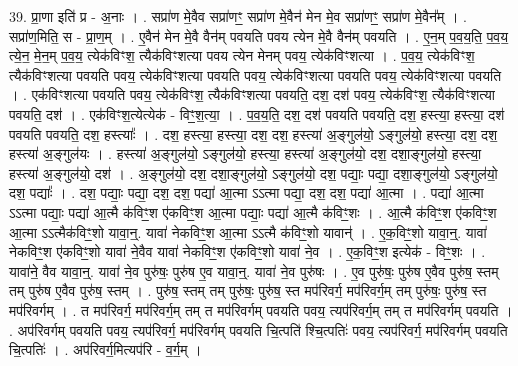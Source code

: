 \documentclass[17pt]{extarticle}
\begin{document}
39. प्रा॒णा इति॑ प्र - अ॒नाः । . सप्रा॑ण मे॒वैव सप्रा॑णꣳ॒॒ सप्रा॑ण मे॒वैन॑ मेन मे॒व सप्रा॑णꣳ॒॒ सप्रा॑ण मे॒वैन᳚म् । . सप्रा॑ण॒मिति॒ स - प्रा॒ण॒म् । . ए॒वैन॑ मेन मे॒वै वैन॑म् पवयति पवय त्येन मे॒वै वैन॑म् पवयति । . ए॒न॒म् प॒व॒य॒ति॒ प॒व॒य॒ त्ये॒न॒ मे॒न॒म् प॒व॒य॒ त्येक॑विꣳश॒ त्यैक॑विꣳशत्या पवय त्येन मेनम् पवय॒ त्येक॑विꣳशत्या । . प॒व॒य॒ त्येक॑विꣳश॒ त्यैक॑विꣳशत्या पवयति पवय॒ त्येक॑विꣳशत्या पवयति पवय॒ त्येक॑विꣳशत्या पवयति पवय॒ त्येक॑विꣳशत्या पवयति । . एक॑विꣳशत्या पवयति पवय॒ त्येक॑विꣳश॒ त्यैक॑विꣳशत्या पवयति॒ दश॒ दश॑ पवय॒ त्येक॑विꣳश॒ त्यैक॑विꣳशत्या पवयति॒ दश॑ । . एक॑विꣳश॒त्येत्येक॑ - विꣳ॒॒श॒त्या॒ । . प॒व॒य॒ति॒ दश॒ दश॑ पवयति पवयति॒ दश॒ हस्त्या॒ हस्त्या॒ दश॑ पवयति पवयति॒ दश॒ हस्त्याः᳚ । . दश॒ हस्त्या॒ हस्त्या॒ दश॒ दश॒ हस्त्या॑ अ॒ङ्गुल॑यो॒ ऽङ्गुल॑यो॒ हस्त्या॒ दश॒ दश॒ हस्त्या॑ अ॒ङ्गुल॑यः । . हस्त्या॑ अ॒ङ्गुल॑यो॒ ऽङ्गुल॑यो॒ हस्त्या॒ हस्त्या॑ अ॒ङ्गुल॑यो॒ दश॒ दशा॒ङ्गुल॑यो॒ हस्त्या॒ हस्त्या॑ अ॒ङ्गुल॑यो॒ दश॑ । . अ॒ङ्गुल॑यो॒ दश॒ दशा॒ङ्गुल॑यो॒ ऽङ्गुल॑यो॒ दश॒ पद्याः॒ पद्या॒ दशा॒ङ्गुल॑यो॒ ऽङ्गुल॑यो॒ दश॒ पद्याः᳚ । . दश॒ पद्याः॒ पद्या॒ दश॒ दश॒ पद्या॑ आ॒त्मा ऽऽत्मा पद्या॒ दश॒ दश॒ पद्या॑ आ॒त्मा । . पद्या॑ आ॒त्मा ऽऽत्मा पद्याः॒ पद्या॑ आ॒त्मै क॑विꣳ॒॒श ए॑कविꣳ॒॒श आ॒त्मा पद्याः॒ पद्या॑ आ॒त्मै क॑विꣳ॒॒शः । . आ॒त्मै क॑विꣳ॒॒श ए॑कविꣳ॒॒श आ॒त्मा ऽऽत्मैक॑विꣳ॒॒शो यावा॒न्॒. यावा॑ नेकविꣳ॒॒श आ॒त्मा ऽऽत्मै क॑विꣳ॒॒शो यावान्॑ । . ए॒क॒विꣳ॒॒शो यावा॒न्॒. यावा॑ नेकविꣳ॒॒श ए॑कविꣳ॒॒शो यावा॑ ने॒वैव यावा॑ नेकविꣳ॒॒श ए॑कविꣳ॒॒शो यावा॑ ने॒व । . ए॒क॒विꣳ॒॒श इत्येक॑ - विꣳ॒॒शः । . यावा॑ने॒ वैव यावा॒न्॒. यावा॑ ने॒व पुरु॑षः॒ पुरु॑ष ए॒व यावा॒न्॒. यावा॑ ने॒व पुरु॑षः । . ए॒व पुरु॑षः॒ पुरु॑ष ए॒वैव पुरु॑ष॒ स्तम् तम् पुरु॑ष ए॒वैव पुरु॑ष॒ स्तम् । . पुरु॑ष॒ स्तम् तम् पुरु॑षः॒ पुरु॑ष॒ स्त मप॑रिवर्ग॒ मप॑रिवर्ग॒म् तम् पुरु॑षः॒ पुरु॑ष॒ स्त मप॑रिवर्गम् । . त मप॑रिवर्ग॒ मप॑रिवर्ग॒म् तम् त मप॑रिवर्गम् पवयति पवय॒ त्यप॑रिवर्ग॒म् तम् त मप॑रिवर्गम् पवयति । . अप॑रिवर्गम् पवयति पवय॒ त्यप॑रिवर्ग॒ मप॑रिवर्गम् पवयति चि॒त्पति॑ श्चि॒त्पतिः॑ पवय॒ त्यप॑रिवर्ग॒ मप॑रिवर्गम् पवयति चि॒त्पतिः॑ । . अप॑रिवर्ग॒मित्यप॑रि - व॒र्ग॒म् । \newline
\pagebreak
{}
\end{document}
